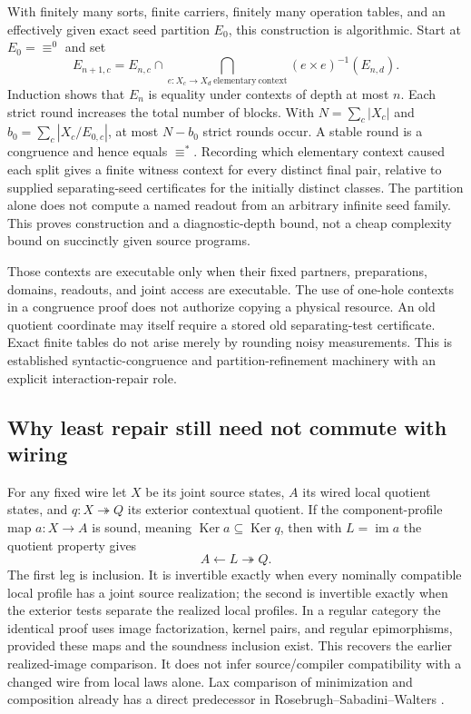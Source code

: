 \documentclass[11pt]{article}
\theoremstyle{definition}
\theoremstyle{remark}\newtheorem{remark}[theorem]{Remark}
\newcommand{\im}{\operatorname{im}}
\newcommand{\Ker}{\operatorname{Ker}}
\begin{document}
With finitely many sorts, finite carriers, finitely many operation
tables, and an effectively given exact seed partition $E_0$, this
construction is algorithmic. Start at $E_0=\equiv^0$ and set
\[
 E_{n+1,c}=E_{n,c}\cap
 \bigcap_{e:X_c\to X_d\ \mathrm{elementary\ context}}
 (e\times e)^{-1}(E_{n,d}).
\]
Induction shows that $E_n$ is equality under contexts of depth at most $n$.
Each strict round increases the total number of blocks. With
$N=\sum_c|X_c|$ and $b_0=\sum_c|X_c/E_{0,c}|$, at most $N-b_0$ strict
rounds occur. A stable round is a congruence and hence equals $\equiv^*$.
Recording which elementary context caused each split gives a finite
witness context for every distinct final pair, relative to supplied
separating-seed certificates for the initially distinct classes. The
partition alone does not compute a named readout from an arbitrary
infinite seed family. This proves construction
and a diagnostic-depth bound, not a cheap complexity bound on succinctly
given source programs.

Those contexts are executable only when their fixed partners, preparations,
domains, readouts, and joint access are executable. The use of one-hole
contexts in a congruence proof does not authorize copying a physical
resource. An old quotient coordinate may itself require a stored old
separating-test certificate. Exact finite tables do not arise merely by
rounding noisy measurements. This is established syntactic-congruence and
partition-refinement machinery with an explicit interaction-repair role.

\subsection{Why least repair still need not commute with wiring}
For any fixed wire let $X$ be its joint source states, $A$ its wired local
quotient states, and $q:X\twoheadrightarrow Q$ its exterior contextual
quotient. If the component-profile map $a:X\to A$ is sound, meaning
$\Ker a\subseteq\Ker q$, then with $L=\im a$ the quotient property gives
\begin{equation}\label{eq:state-span}
                 A\longleftarrow L\twoheadrightarrow Q.
\end{equation}
The first leg is inclusion. It is invertible exactly when every nominally
compatible local profile has a joint source realization; the second is
invertible exactly when the exterior tests separate the realized local
profiles. In a regular category the identical proof uses image
factorization, kernel pairs, and regular epimorphisms, provided these maps
and the soundness inclusion exist. This recovers the earlier realized-image
comparison. It does not infer source/compiler compatibility with a changed
wire from local laws alone. Lax comparison of minimization and composition
already has a direct predecessor in Rosebrugh--Sabadini--Walters \cite{rsw}.
\end{document}
